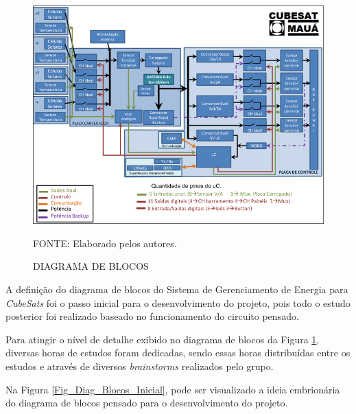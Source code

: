 \documentclass[
	12pt,				%
	openright,			%
	oneside,			%
	a4paper,			%
	english,			%
	french,				%
	spanish,			%
	brazil,				%
	oldfontcommands
	]{abntex2}
\begin{document}
	\begin{figure}[th]
		\caption{DIAGRAMA DE BLOCOS}
		\label{Fig_Diag_Blocos_Final}
		\centering
		\includegraphics[width=1.0\linewidth]{./figs/diag_blocos}
			
		\begin{small}
			FONTE: Elaborado pelos autores.
		\end{small}		
	\end{figure}
	\pagebreak
	
	A definição do diagrama de blocos do Sistema de Gerenciamento de Energia para \textit{CubeSats} foi o passo inicial para o desenvolvimento do projeto, pois todo o estudo posterior foi realizado baseado no funcionamento do circuito pensado.

	Para atingir o nível de detalhe exibido no diagrama de blocos da Figura \ref{Fig_Diag_Blocos_Final}, diversas horas de estudos foram dedicadas, sendo essas horas distribuídas entre os estudos e através de diversos \textit{brainstorms} realizados pelo grupo.
	
	Na Figura \ref{Fig_Diag_Blocos_Inicial}, pode ser visualizado a ideia embrionária do diagrama de blocos pensado para o desenvolvimento do projeto.
		
\end{document}
